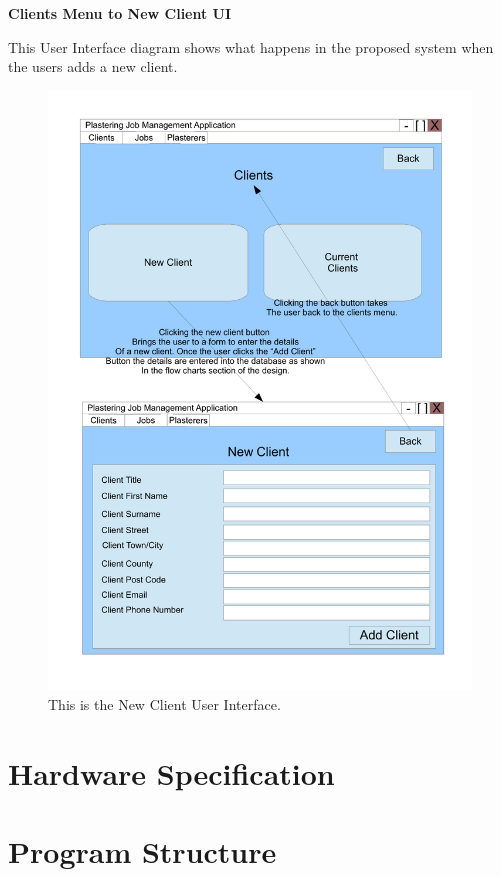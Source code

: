 \textbf{Clients Menu to New Client UI}
\begin{flushleft}
This User Interface diagram shows what happens in the proposed system when the users adds a new client.
\end{flushleft}
\begin{figure}[H]
\includegraphics[scale=0.5]{./Design/images/UI-NewClient.pdf}
    \caption{This is the New Client User Interface.} 
\label{fig:FlowChartNewClient}
\end{figure}

\section{Hardware Specification}

\section{Program Structure}

